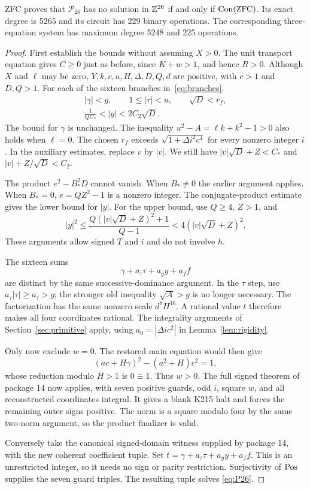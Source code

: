 \begin{theorem}
ZFC proves that $\mathcal P_{26}$ has no solution in $\mathbb Z^{26}$ if and
only if $\operatorname{Con}(\mathrm{ZFC})$.  Its exact degree is 5265 and its circuit
has 229 binary operations.  The corresponding three-equation system
has maximum degree 5248 and 225 operations.
\end{theorem}
\begin{proof}
First establish the bounds without assuming $X>0$.
The unit transport equation gives $C\ge0$ just as before, since
$K+w>1$, and hence $R>0$.  Although $X$ and $\ell$ may be zero,
$Y,k,c,a,H,\Delta,D,Q,d$ are positive, with $c>1$ and $D,Q>1$.
For each of the sixteen branches in~\eqref{eq:branches},
\begin{gather*}
|\gamma|<g,\qquad 1\le|\tau|<u,\qquad \sqrt D<r_f,\\
\frac1{QC_*}<|y|<2C_2\sqrt D.
\end{gather*}
The bound for $\gamma$ is unchanged.  The inequality
$u^2-A=\ell k+k^2-1>0$ also holds when $\ell=0$.
The chosen $r_f$ exceeds $\sqrt{1+\Delta i^2c^4}$ for every nonzero
integer $i$.  In the auxiliary estimates, replace $v$ by $|v|$.
We still have $|v|\sqrt D+Z<C_*$ and
$|v|+Z/\sqrt D<C_2$.

The product $e^2-B_*^2D$ cannot vanish.  When $B_*\ne0$ the earlier
argument applies.  When $B_*=0$, $e=QZ^2-1$ is a nonzero integer.
The conjugate-product estimate gives the lower bound for $|y|$.
For the upper bound, use $Q\ge4$, $Z>1$, and
\[
|y|^2\le\frac{Q(|v|\sqrt D+Z)^2+1}{Q-1}
 <4(|v|\sqrt D+Z)^2.
\]
These arguments allow signed $T$ and $i$ and do not involve $h$.

The sixteen sums
\[
\gamma+a_\tau\tau+a_y y+a_f f
\]
are distinct by the same successive-dominance argument.  In the
$\tau$ step, use $a_\tau|\tau|\ge a_\tau>g$; the stronger old
inequality $\sqrt A>g$ is no longer necessary.  The factorization has
the same nonzero scale $d^8H^{16}$.  A rational value $t$ therefore
makes all four coordinates rational.  The integrality arguments of
Section~\ref{sec:primitive} apply, using
$a_0=|\Delta i c^2|$ in Lemma~\ref{lem:rigidity}.

Only now exclude $w=0$.  The restored main equation would then give
\[
(ac+H\gamma)^2-(a^2+H)c^2=1,
\]
whose reduction modulo $H>1$ is $0\equiv1$.  Thus $w>0$.
The full signed theorem of package 14 now applies, with seven positive
guards, odd $i$, square $w$, and all reconstructed coordinates integral.
It gives a blank K215 halt and forces the remaining outer signs
positive.  The norm is a square modulo four by the same two-norm
argument, so the product finalizer is valid.

Conversely take the canonical signed-domain witness supplied by package
14, with the new coherent coefficient tuple.  Set
$t=\gamma+a_\tau\tau+a_y y+a_f f$.  This is an unrestricted integer,
so it needs no sign or parity restriction.  Surjectivity of $\operatorname{Pos}$
supplies the seven guard triples.  The resulting tuple solves
\eqref{eq:P26}.
\end{proof}

